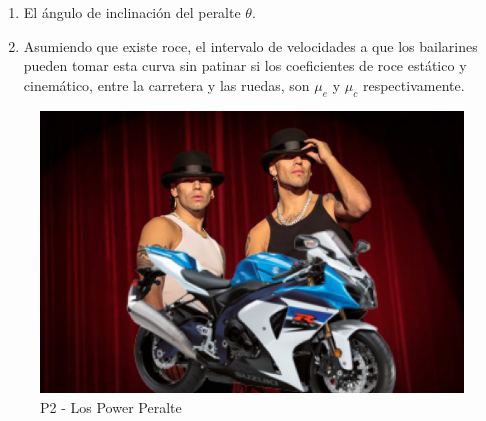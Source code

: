 \documentclass[letterpaper,11pt]{article}
\begin{document}
\begin{enumerate}
\begin{enumerate}
    \item El ángulo de inclinación del peralte $\theta$.
    
    \item Asumiendo que existe roce, el intervalo de velocidades a que los bailarines pueden tomar esta curva sin patinar si los coeficientes de roce estático y cinemático, entre la carretera y las ruedas, son $\mu_e$ y $\mu_c$ respectivamente.
\end{enumerate}

    \begin{figure}[H]
        \centering
        \includegraphics[width=0.39\linewidth]{2022-2/Imagenes/Taller6/PowerPeralte.png}
        \hspace{2em}

        \caption{P2 - Los Power Peralte}
    \end{figure} 




%   

\end{enumerate}
\end{document}
